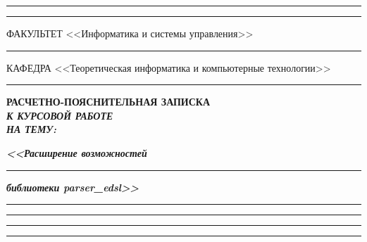\documentclass[14pt, russian]{scrartcl}
\begin{document}
\begin{titlepage}
	\vspace{-2pt}
	\hspace{-34.5pt}\rule{\textwidth}{2.5pt}

	\vspace*{-20.3pt}
	\hspace{-34.5pt}\rule{\textwidth}{0.4pt}

	\vspace{0.5ex}
	\noindent \small ФАКУЛЬТЕТ\hspace{80pt} <<Информатика и системы управления>>

	\vspace*{-16pt}
	\hspace{35pt}\rule{0.855\textwidth}{0.4pt}

	\vspace{0.5ex}
	\noindent \small КАФЕДРА\hspace{50pt} <<Теоретическая информатика и компьютерные технологии>>

	\vspace*{-16pt}
	\hspace{25pt}\rule{0.875\textwidth}{0.4pt}


	\vspace{3em}

	\begin{center}
		\Large \bf{РАСЧЕТНО-ПОЯСНИТЕЛЬНАЯ ЗАПИСКА\\\textbf{\textit{К КУРСОВОЙ РАБОТЕ\\НА ТЕМУ:}} \\}
	\end{center}

	\vspace*{-6ex}
	\begin{center}
		\Large{\textit{\textbf{<<Расширение возможностей}}}

		\vspace*{-3ex}
		\rule{0.9\textwidth}{1.2pt}

		\vspace*{-0.2ex}
		\Large{\textit{\textbf{библиотеки parser\_edsl>>}}}
		\vspace*{-3ex}
		\vspace*{-0.2ex}
		\rule{0.9\textwidth}{1.2pt}

		\vspace*{-0.2ex}
		\rule{0.9\textwidth}{1.2pt}

		\vspace*{-0.2ex}
		\rule{0.9\textwidth}{1.2pt}

		\vspace*{-0.2ex}
		\rule{0.9\textwidth}{1.2pt}
	\end{center}


\end{titlepage}
\end{document}
